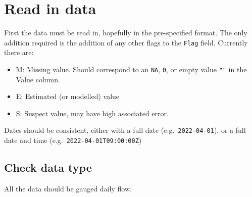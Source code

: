 \documentclass[
]{article}
\newenvironment{Shaded}{\begin{snugshade}}{\end{snugshade}}
\newcommand{\AttributeTok}[1]{\textcolor[rgb]{0.77,0.63,0.00}{#1}}
\newcommand{\CommentTok}[1]{\textcolor[rgb]{0.56,0.35,0.01}{\textit{#1}}}
\newcommand{\DecValTok}[1]{\textcolor[rgb]{0.00,0.00,0.81}{#1}}
\newcommand{\FunctionTok}[1]{\textcolor[rgb]{0.00,0.00,0.00}{#1}}
\newcommand{\NormalTok}[1]{#1}
\newcommand{\OtherTok}[1]{\textcolor[rgb]{0.56,0.35,0.01}{#1}}
\newcommand{\SpecialCharTok}[1]{\textcolor[rgb]{0.00,0.00,0.00}{#1}}
\newcommand{\StringTok}[1]{\textcolor[rgb]{0.31,0.60,0.02}{#1}}
\providecommand{\tightlist}{%
  \setlength{\itemsep}{0pt}\setlength{\parskip}{0pt}}
\begin{document}
\hypertarget{read-in-data}{%
\section{Read in data}\label{read-in-data}}

First the data must be read in, hopefully in the pre-specified format.
The only addition required is the addition of any other flags to the
\texttt{Flag} field. Currently there are:

\begin{itemize}
\tightlist
\item
  M: Missing value. Should correspond to an \texttt{NA}, \texttt{0}, or
  empty value \texttt{""} in the Value column.
\item
  E: Estimated (or modelled) value
\item
  S: Suspect value, may have high associated error.
\end{itemize}

Dates should be consistent, either with a full date
(e.g.~\texttt{2022-04-01}), or a full date and time
(e.g.~\texttt{2022-04-01T09:00:00Z})

\begin{Shaded}
\end{Shaded}

\hypertarget{check-data-type}{%
\subsection{Check data type}\label{check-data-type}}

All the data should be gauged daily flow.
\end{document}
